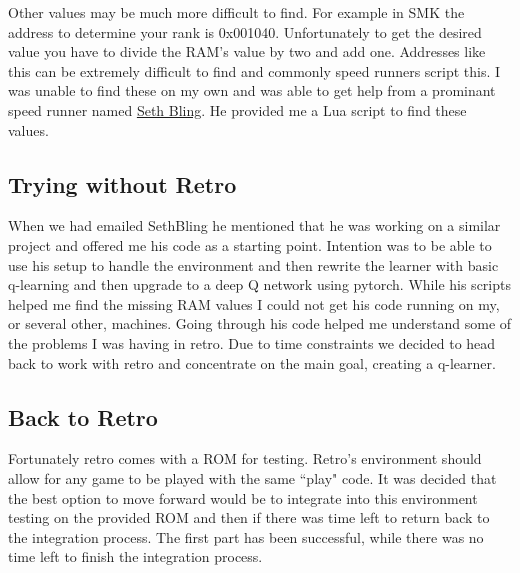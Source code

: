 Other values may be much more difficult to find. For example in SMK the address
to determine your rank is 0x001040. Unfortunately to get the desired value
you have to divide the RAM's value by two and add one. Addresses like this 
can be extremely difficult to find and commonly speed runners script this. I 
was unable to find these on my own and was able to get help from a prominant
speed runner named \href{https://www.youtube.com/user/sethbling}{Seth Bling}.
He provided me a Lua script to find these values. 

\subsection{Trying without Retro}
When we had emailed SethBling he mentioned that he was working on a similar 
project and offered me his code as a starting point. Intention was to be able
to use his setup to handle the environment and then rewrite the learner with
basic q-learning and then upgrade to a deep Q network using pytorch. While his
scripts helped me find the missing RAM values I could not get his code running
on my, or several other, machines. Going through his code helped me understand
some of the problems I was having in retro. Due to time constraints we decided
to head back to work with retro and concentrate on the main goal, creating a
q-learner.

\subsection{Back to Retro}
Fortunately retro comes with a ROM for testing. Retro's environment should allow
for any game to be played with the same ``play" code. It was decided that the
best option to move forward would be to integrate into this environment testing
on the provided ROM and then if there was time left to return back to the 
integration process. The first part has been successful, while there was no
time left to finish the integration process.

